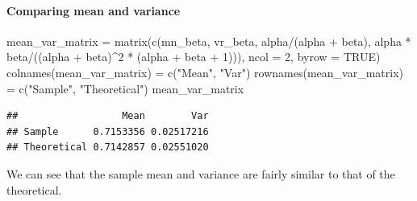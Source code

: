 \documentclass[
]{article}
\newenvironment{Shaded}{\begin{snugshade}}{\end{snugshade}}
\newcommand{\AttributeTok}[1]{\textcolor[rgb]{0.77,0.63,0.00}{#1}}
\newcommand{\ConstantTok}[1]{\textcolor[rgb]{0.00,0.00,0.00}{#1}}
\newcommand{\DecValTok}[1]{\textcolor[rgb]{0.00,0.00,0.81}{#1}}
\newcommand{\FunctionTok}[1]{\textcolor[rgb]{0.00,0.00,0.00}{#1}}
\newcommand{\NormalTok}[1]{#1}
\newcommand{\OtherTok}[1]{\textcolor[rgb]{0.56,0.35,0.01}{#1}}
\newcommand{\SpecialCharTok}[1]{\textcolor[rgb]{0.00,0.00,0.00}{#1}}
\newcommand{\StringTok}[1]{\textcolor[rgb]{0.31,0.60,0.02}{#1}}
\begin{document}
\hypertarget{comparing-mean-and-variance-1}{%
\paragraph{Comparing mean and
variance}\label{comparing-mean-and-variance-1}}

\begin{Shaded}
\begin{Highlighting}[]
\NormalTok{mean\_var\_matrix }\OtherTok{=} \FunctionTok{matrix}\NormalTok{(}\FunctionTok{c}\NormalTok{(mn\_beta, vr\_beta, alpha}\SpecialCharTok{/}\NormalTok{(alpha }\SpecialCharTok{+}\NormalTok{ beta), alpha }\SpecialCharTok{*}\NormalTok{ beta}\SpecialCharTok{/}\NormalTok{((alpha }\SpecialCharTok{+} 
\NormalTok{    beta)}\SpecialCharTok{\^{}}\DecValTok{2} \SpecialCharTok{*}\NormalTok{ (alpha }\SpecialCharTok{+}\NormalTok{ beta }\SpecialCharTok{+} \DecValTok{1}\NormalTok{))), }\AttributeTok{ncol =} \DecValTok{2}\NormalTok{, }\AttributeTok{byrow =} \ConstantTok{TRUE}\NormalTok{)}
\FunctionTok{colnames}\NormalTok{(mean\_var\_matrix) }\OtherTok{=} \FunctionTok{c}\NormalTok{(}\StringTok{"Mean"}\NormalTok{, }\StringTok{"Var"}\NormalTok{)}
\FunctionTok{rownames}\NormalTok{(mean\_var\_matrix) }\OtherTok{=} \FunctionTok{c}\NormalTok{(}\StringTok{"Sample"}\NormalTok{, }\StringTok{"Theoretical"}\NormalTok{)}
\NormalTok{mean\_var\_matrix}
\end{Highlighting}
\end{Shaded}

\begin{verbatim}
##                  Mean        Var
## Sample      0.7153356 0.02517216
## Theoretical 0.7142857 0.02551020
\end{verbatim}

We can see that the sample mean and variance are fairly similar to that
of the theoretical.
\end{document}
